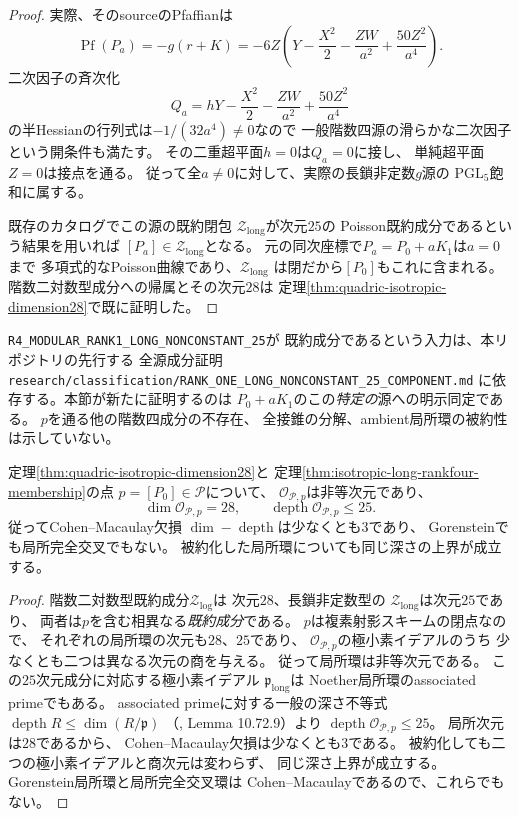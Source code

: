 \begin{proof}
実際、そのsourceのPfaffianは
\[
 \operatorname{Pf}(P_a)=-g(r+K)
   =-6Z\left(Y-\frac{X^2}{2}-\frac{ZW}{a^2}
                           +\frac{50Z^2}{a^4}\right).
\]
二次因子の斉次化
\[
 Q_a=hY-\frac{X^2}{2}-\frac{ZW}{a^2}
                              +\frac{50Z^2}{a^4}
\]
の半Hessianの行列式は\(-1/(32a^4)\ne0\)なので
一般階数四源の滑らかな二次因子という開条件も満たす。
その二重超平面\(h=0\)は\(Q_a=0\)に接し、
単純超平面\(Z=0\)は接点を通る。
従って全\(a\ne0\)に対して、実際の長鎖非定数\(g\)源の
\(\mathrm{PGL}_5\)飽和に属する。

既存のカタログでこの源の既約閉包
\(\mathcal Z_{\mathrm{long}}\)が次元\(25\)の
Poisson既約成分であるという結果を用いれば
\([P_a]\in\mathcal Z_{\mathrm{long}}\)となる。
元の同次座標で\(P_a=P_0+aK_1\)は\(a=0\)まで
多項式的なPoisson曲線であり、\(\mathcal Z_{\mathrm{long}}\)
は閉だから\([P_0]\)もこれに含まれる。
階数二対数型成分への帰属とその次元\(28\)は
定理\ref{thm:quadric-isotropic-dimension28}で既に証明した。
\end{proof}

\begin{remark}[既知の成分性と今回の同定の分離]
\texttt{R4\_MODULAR\_RANK1\_LONG\_NONCONSTANT\_25}が
既約成分であるという入力は、本リポジトリの先行する
全源成分証明
\texttt{research/classification/RANK\_ONE\_LONG\_NONCONSTANT\_25\_COMPONENT.md}
に依存する。本節が新たに証明するのは
\(P_0+aK_1\)のこの\emph{特定の}源への明示同定である。
\(p\)を通る他の階数四成分の不存在、
全接錐の分解、ambient局所環の被約性は示していない。
\end{remark}


\begin{corollary}
\label{cor:poisson-p4-not-cm-at-isotropic-log}
定理\ref{thm:quadric-isotropic-dimension28}と
定理\ref{thm:isotropic-long-rankfour-membership}の点
\(p=[P_0]\in\mathcal P\)について、
\(\mathcal O_{\mathcal P,p}\)は非等次元であり、
\[
 \dim\mathcal O_{\mathcal P,p}=28,\qquad
 \operatorname{depth}\mathcal O_{\mathcal P,p}\le25.
\]
従ってCohen--Macaulay欠損
\(\dim-\operatorname{depth}\)は少なくとも\(3\)であり、
Gorensteinでも局所完全交叉でもない。
被約化した局所環についても同じ深さの上界が成立する。
\end{corollary}
\begin{proof}
階数二対数型既約成分\(\mathcal Z_{\mathrm{log}}\)は
次元\(28\)、長鎖非定数型の
\(\mathcal Z_{\mathrm{long}}\)は次元\(25\)であり、
両者は\(p\)を含む相異なる\emph{既約成分}である。
\(p\)は複素射影スキームの閉点なので、
それぞれの局所環の次元も\(28\)、\(25\)であり、
\(\mathcal O_{\mathcal P,p}\)の極小素イデアルのうち
少なくとも二つは異なる次元の商を与える。
従って局所環は非等次元である。
この\(25\)次元成分に対応する極小素イデアル
\(\mathfrak p_{\mathrm{long}}\)は
Noether局所環のassociated primeでもある。
associated primeに対する一般の深さ不等式
\(\operatorname{depth}R\le\dim(R/\mathfrak p)\)
（\cite{StacksDepth}, Lemma 10.72.9）より
\(\operatorname{depth}\mathcal O_{\mathcal P,p}\le25\)。
局所次元は\(28\)であるから、
Cohen--Macaulay欠損は少なくとも\(3\)である。
被約化しても二つの極小素イデアルと商次元は変わらず、
同じ深さ上界が成立する。
Gorenstein局所環と局所完全交叉環は
Cohen--Macaulayであるので、これらでもない。
\end{proof}

